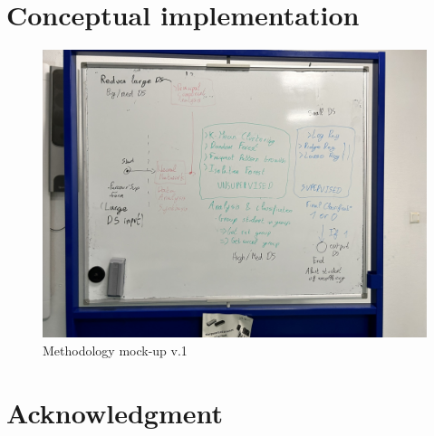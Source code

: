\documentclass[conference]{IEEEtran}
\begin{document}
\section{Conceptual implementation}

\begin{figure}
    \centering
    \includegraphics[width=1\linewidth]{res//diagram/approach_v1_raw.jpeg}
    \caption{Methodology mock-up v.1}
    \label{fig:enter-label}
\end{figure}

\vspace{16pt}
\section*{Acknowledgment}
\vspace{12pt}



\end{document}
